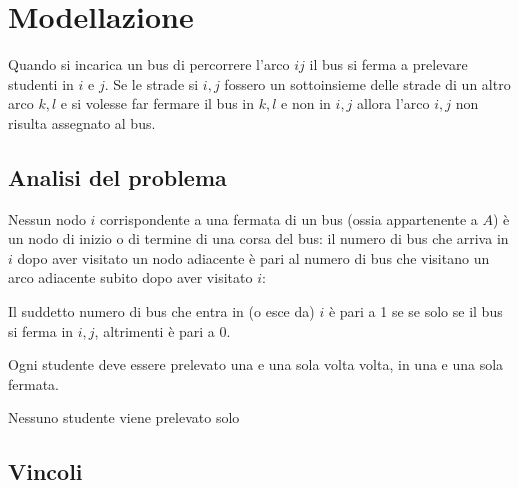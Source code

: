 
\chapter{Modellazione}

\ifpdf
    \graphicspath{{Chapter3/Figs/Raster/}{Chapter3/Figs/PDF/}{Chapter3/Figs/}}
\else
    \graphicspath{{Chapter3/Figs/Vector/}{Chapter3/Figs/}}
\fi
Quando si incarica un bus di percorrere l'arco $ij$ il bus si ferma a prelevare studenti in $i$ e $j$. Se le strade si $i,j$ fossero un sottoinsieme delle strade di un altro arco $k,l$ e si volesse far fermare il bus in $k,l$ e non in $i,j$ allora l'arco $i,j$ non risulta assegnato al bus.
\section{Analisi del problema}
Nessun nodo $i$ corrispondente a una fermata di un bus (ossia appartenente a $A$) è un nodo di inizio o di termine di una corsa del bus: il numero di bus che arriva in $i$ dopo aver visitato un nodo adiacente è pari al numero di bus che visitano un arco adiacente subito dopo aver visitato $i$:

Il suddetto numero di bus che entra in (o esce da) $i$ è pari a 1 se se solo se il bus si ferma in $i,j$, altrimenti è pari a 0.


Ogni studente deve essere prelevato una e una sola volta volta, in una e una sola fermata.

Nessuno studente viene prelevato solo

\section{Vincoli}

